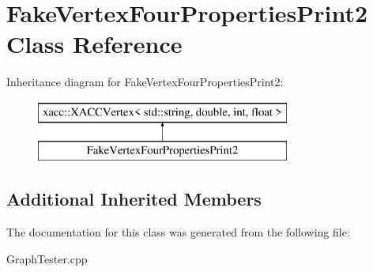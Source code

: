 \hypertarget{a01224}{}\section{Fake\+Vertex\+Four\+Properties\+Print2 Class Reference}
\label{a01224}
Inheritance diagram for Fake\+Vertex\+Four\+Properties\+Print2\+:\begin{figure}[H]
\begin{center}
\leavevmode
\includegraphics[height=2.000000cm]{a01224}
\end{center}
\end{figure}
\subsection*{Additional Inherited Members}


The documentation for this class was generated from the following file\+:\begin{DoxyCompactItemize}
\item 
Graph\+Tester.\+cpp\end{DoxyCompactItemize}
